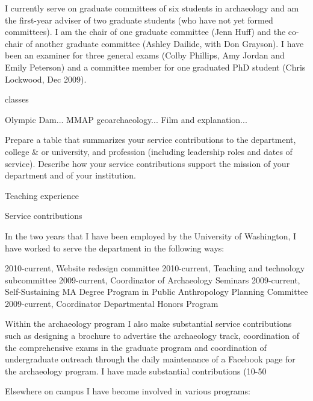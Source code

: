 \documentclass[11pt,article,oneside]{memoir}
\begin{document}
I currently serve on graduate committees of six students in archaeology and am the first-year adviser of two graduate students (who have not yet formed committees). I am the chair of one graduate committee (Jenn Huff) and the co-chair of another graduate committee (Ashley Dailide, with Don Grayson). I have been an examiner for three general exams (Colby Phillips, Amy Jordan and Emily Peterson) and a committee member for one graduated PhD student (Chris Lockwood, Dec 2009). 

classes

Olympic Dam... MMAP geoarchaeology... Film and explanation... 

\bigskip     


Prepare a table that summarizes your service contributions to the department, college \& or university, and profession (including leadership roles and dates of service). Describe how your service contributions support the mission of your department and of your institution.





Teaching experience



Service contributions

In the two years that I have been employed by the University of Washington, I have worked to serve the department in the following ways:

	2010-current, Website redesign committee
	2010-current, Teaching and technology subcommittee  
2009-current, Coordinator of Archaeology Seminars 
2009-current, Self-Sustaining MA Degree Program in Public Anthropology Planning Committee
2009-current, Coordinator Departmental Honors Program 

Within the archaeology program I also make substantial service contributions such as designing a brochure to advertise the archaeology track, coordination of the comprehensive exams in the graduate program and coordination of undergraduate outreach through the daily maintenance of a Facebook page for the archaeology program. I have made substantial contributions (10-50%

Elsewhere on campus I have become involved in various programs:
\end{document}
